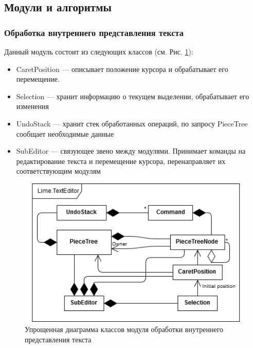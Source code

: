 \documentclass{fefu}
\begin{document}
		\subsection{Модули и алгоритмы}
			\subsubsection{Обработка внутреннего представления текста}
				\par Данный модуль состоит из следующих классов (см. Рис. 
				\ref{diag:SubEditorScheme}):
				\begin{itemize}
					\item CaretPosition --- описывает положение курсора и 
					обрабатывает его перемещение.
					\item Selection --- хранит информацию о текущем выделении, обрабатывает его
					изменения
					\item UndoStack --- хранит стек обработанных операций, по запросу PieceTree 
					сообщает необходимые данные
					\item SubEditor --- связующее звено между модулями. Принимает команды на 
					редактирование текста и перемещение курсора, перенаправляет их
					соответствующим модулям
				\end{itemize}
				\begin{figure}[h]
					\centering
					\includegraphics[width=1\linewidth]{diagrams/SubEditorScheme.png}
					\caption{Упрощенная диаграмма классов модуля обработки внутреннего 
					представления текста}
					\label{diag:SubEditorScheme}
				\end{figure}
\end{document}
